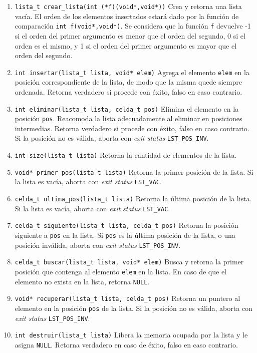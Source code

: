 \documentclass[12pt,a4paper]{article}
\begin{document}
\begin{enumerate}
	
	\item \texttt{lista\_t crear\_lista(int (*f)(void*,void*))} Crea y retorna una lista vacía. El orden de los elementos insertados estará dado por la función de comparación \texttt{int f(void*,void*)}. Se considera que la función \texttt{f} devuelve -1 si el orden del primer argumento es menor que el orden del segundo, 0 si el orden es el mismo, y 1 si el orden del primer argumento es mayor que el orden del segundo.
	
	\item \texttt{int insertar(lista\_t lista,  void* elem)} Agrega el elemento \texttt{elem} en la posición correspondiente de la lista, de modo que la misma quede siempre ordenada. Retorna verdadero si procede con éxito, falso en caso contrario.
	
	\item \texttt{int eliminar(lista\_t lista, celda\_t pos)} Elimina el elemento en la posición \texttt{pos}. Reacomoda la lista adecuadamente al eliminar en posiciones intermedias. Retorna verdadero si procede con éxito, falso en caso contrario. Si la posición no es válida, aborta con \emph{exit status} \texttt{LST\_POS\_INV}.
	
	\item \texttt{int size(lista\_t lista)} Retorna la cantidad de elementos de la lista.
	
	\item \texttt{void* primer\_pos(lista\_t lista)} Retorna la primer posición de la lista. Si la lista es vacía, aborta con \emph{exit status} \texttt{LST\_VAC}.
	
	\item \texttt{celda\_t ultima\_pos(lista\_t lista)} Retorna la última posición de la lista. Si la lista es vacía, aborta con \emph{exit status} \texttt{LST\_VAC}.

	\item \texttt{celda\_t siguiente(lista\_t lista, celda\_t pos)} Retorna la posición siguiente a \texttt{pos} en la lista. Si \texttt{pos} es la última posición de la lista, o una posición inválida, aborta con \emph{exit status} \texttt{LST\_POS\_INV}.
	
	\item \texttt{celda\_t buscar(lista\_t lista, void* elem)} Busca y retorna la primer posición que contenga al elemento \texttt{elem} en la lista. En caso de que el elemento no exista en la lista, retorna \texttt{NULL}.
	
	\item \texttt{void* recuperar(lista\_t lista, celda\_t pos)} Retorna un puntero al elemento en la posición \texttt{pos} de la lista. Si la posición no es válida, aborta con \emph{exit status} \texttt{LST\_POS\_INV}.
	
	\item \texttt{int destruir(lista\_t lista)} Libera la memoria ocupada por la lista y le asigna \texttt{NULL}. Retorna verdadero en caso de éxito, falso en caso contrario.	
\end{enumerate}
\end{document}
